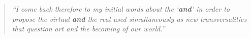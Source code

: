\begin{quote}
	\textit{``I come back therefore to my initial words about the `\textbf{and}' in order to propose the virtual \textbf{and} the real used simultaneously as new transversalities that question art and the becoming of our world.''}~\cite{Orlan2002}
\end{quote}

